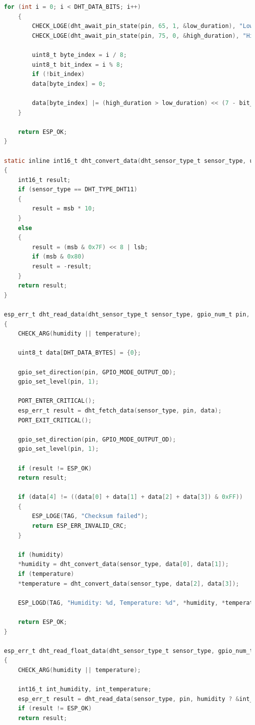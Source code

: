 \documentclass[UTF8]{ctexart}
\begin{document}
\begin{appendices}
\begin{lstlisting}[language=C, caption=dht.c]
	for (int i = 0; i < DHT_DATA_BITS; i++)
	{
		CHECK_LOGE(dht_await_pin_state(pin, 65, 1, &low_duration), "Low duration timeout");
		CHECK_LOGE(dht_await_pin_state(pin, 75, 0, &high_duration), "High duration timeout");
		
		uint8_t byte_index = i / 8;
		uint8_t bit_index = i % 8;
		if (!bit_index)
		data[byte_index] = 0;
		
		data[byte_index] |= (high_duration > low_duration) << (7 - bit_index);
	}
	
	return ESP_OK;
}

static inline int16_t dht_convert_data(dht_sensor_type_t sensor_type, uint8_t msb, uint8_t lsb)
{
	int16_t result;
	if (sensor_type == DHT_TYPE_DHT11)
	{
		result = msb * 10;
	}
	else
	{
		result = (msb & 0x7F) << 8 | lsb;
		if (msb & 0x80)
		result = -result;
	}
	return result;
}

esp_err_t dht_read_data(dht_sensor_type_t sensor_type, gpio_num_t pin, int16_t *humidity, int16_t *temperature)
{
	CHECK_ARG(humidity || temperature);
	
	uint8_t data[DHT_DATA_BYTES] = {0};
	
	gpio_set_direction(pin, GPIO_MODE_OUTPUT_OD);
	gpio_set_level(pin, 1);
	
	PORT_ENTER_CRITICAL();
	esp_err_t result = dht_fetch_data(sensor_type, pin, data);
	PORT_EXIT_CRITICAL();
	
	gpio_set_direction(pin, GPIO_MODE_OUTPUT_OD);
	gpio_set_level(pin, 1);
	
	if (result != ESP_OK)
	return result;
	
	if (data[4] != ((data[0] + data[1] + data[2] + data[3]) & 0xFF))
	{
		ESP_LOGE(TAG, "Checksum failed");
		return ESP_ERR_INVALID_CRC;
	}
	
	if (humidity)
	*humidity = dht_convert_data(sensor_type, data[0], data[1]);
	if (temperature)
	*temperature = dht_convert_data(sensor_type, data[2], data[3]);
	
	ESP_LOGD(TAG, "Humidity: %d, Temperature: %d", *humidity, *temperature);
	
	return ESP_OK;
}

esp_err_t dht_read_float_data(dht_sensor_type_t sensor_type, gpio_num_t pin, float *humidity, float *temperature)
{
	CHECK_ARG(humidity || temperature);
	
	int16_t int_humidity, int_temperature;
	esp_err_t result = dht_read_data(sensor_type, pin, humidity ? &int_humidity : NULL, temperature ? &int_temperature : NULL);
	if (result != ESP_OK)
	return result;
	

\end{lstlisting}
\end{appendices}
\end{document}
